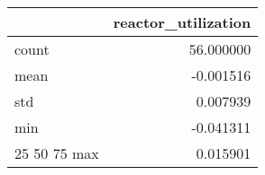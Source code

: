\begin{tabular}{lr}
\toprule
 & reactor\_utilization \\
\midrule
count & 56.000000 \\
mean & -0.001516 \\
std & 0.007939 \\
min & -0.041311 \\
25%
50%
75%
max & 0.015901 \\
\bottomrule
\end{tabular}

